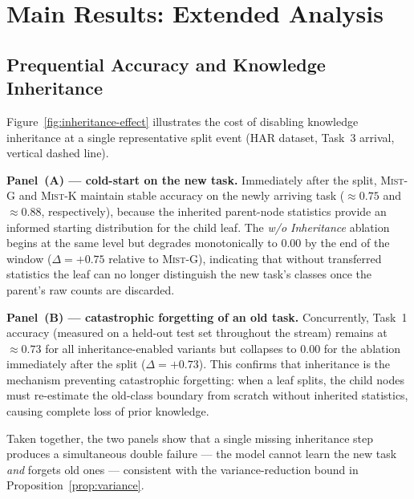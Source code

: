 \documentclass{article}
\newcommand{\mist}{\textsc{Mist}}
\begin{document}
\section{Main Results: Extended Analysis}
\label{app:results}

\subsection{Prequential Accuracy and Knowledge Inheritance}
\label{app:prequential}

Figure~\ref{fig:inheritance-effect} illustrates the cost of disabling
knowledge inheritance at a single representative split event (HAR dataset,
Task~3 arrival, vertical dashed line).

\textbf{Panel~(A) — cold-start on the new task.}
Immediately after the split, \mist{}-G and \mist{}-K maintain stable
accuracy on the newly arriving task (${\approx}0.75$ and ${\approx}0.88$,
respectively), because the inherited parent-node statistics provide an
informed starting distribution for the child leaf.  The \emph{w/o
Inheritance} ablation begins at the same level but degrades monotonically
to $0.00$ by the end of the window ($\Delta{=}{+}0.75$ relative to
\mist{}-G), indicating that without transferred statistics the leaf can no
longer distinguish the new task's classes once the parent's raw counts are
discarded.

\textbf{Panel~(B) — catastrophic forgetting of an old task.}
Concurrently, Task~1 accuracy (measured on a held-out test set throughout
the stream) remains at ${\approx}0.73$ for all inheritance-enabled variants
but collapses to $0.00$ for the ablation immediately after the split
($\Delta{=}{+}0.73$).  This confirms that inheritance is the mechanism
preventing catastrophic forgetting: when a leaf splits, the child nodes
must re-estimate the old-class boundary from scratch without inherited
statistics, causing complete loss of prior knowledge.

Taken together, the two panels show that a single missing inheritance step
produces a simultaneous double failure — the model cannot learn the new task
\emph{and} forgets old ones — consistent with the variance-reduction bound
in Proposition~\ref{prop:variance}.
\end{document}
